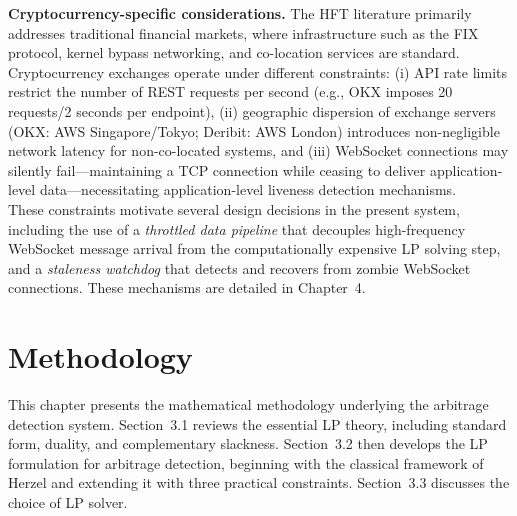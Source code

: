 \documentclass[openany]{book}
\numberwithin{figure}{chapter}
\numberwithin{equation}{chapter}
\begin{document}
\textbf{Cryptocurrency-specific considerations.} The HFT literature primarily addresses traditional financial markets, where infrastructure such as the FIX protocol, kernel bypass networking, and co-location services are standard. Cryptocurrency exchanges operate under different constraints: (i) API rate limits restrict the number of REST requests per second (e.g., OKX imposes 20 requests/2 seconds per endpoint), (ii) geographic dispersion of exchange servers (OKX: AWS Singapore/Tokyo; Deribit: AWS London) introduces non-negligible network latency for non-co-located systems, and (iii) WebSocket connections may silently fail---maintaining a TCP connection while ceasing to deliver application-level data---necessitating application-level liveness detection mechanisms.\\

These constraints motivate several design decisions in the present system, including the use of a \textit{throttled data pipeline} that decouples high-frequency WebSocket message arrival from the computationally expensive LP solving step, and a \textit{staleness watchdog} that detects and recovers from zombie WebSocket connections. These mechanisms are detailed in Chapter~4.

\chapter{Methodology}
%

This chapter presents the mathematical methodology underlying the arbitrage detection system. Section~3.1 reviews the essential LP theory, including standard form, duality, and complementary slackness. Section~3.2 then develops the LP formulation for arbitrage detection, beginning with the classical framework of Herzel \cite{herzel2005} and extending it with three practical constraints. Section~3.3 discusses the choice of LP solver.
\end{document}
